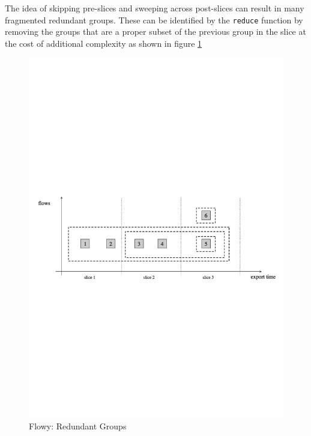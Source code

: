 The idea of skipping pre-slices and sweeping across post-slices can result in many fragmented redundant groups. These can be identified by the \texttt{reduce} function by removing the groups that are a proper subset of the previous group in the slice at the cost of additional complexity as shown in figure \ref{fig:flowy-redundant-groups}
\begin{figure}[h!]
\begin{center}
  \includegraphics* [width=1.0\linewidth]{figures/flowy-redundant-groups}	
  \caption{Flowy: Redundant Groups \cite{pnemeth:thesis:2010}}
  \label{fig:flowy-redundant-groups}
\end{center}
\end{figure}

